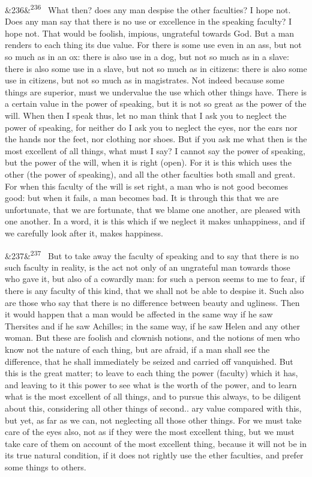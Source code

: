 \documentclass[12pt]{article}
\newcommand{\para}[1][]{\par\noindent\ifx&#1&\else\textsuperscript{\footnotesize #1}~\fi}
\begin{document}
\para[236] What then? does any man despise the other faculties? I hope not. Does any man say that there is no use or excellence in the speaking faculty? I hope not. That would be foolish, impious, ungrateful towards God. But a man renders to each thing its due value. For there is some use even in an ass, but not so much as in an ox: there is also use in a dog, but not so much as in a slave: there is also some use in a slave, but not so much as in citizens: there is also some use in citizens, but not so much as in magistrates. Not indeed because some things are superior, must we undervalue the use which other things have. There is a certain value in the power of speaking, but it is not so great as the power of the will. When then I speak thus, let no man think that I ask you to neglect the power of speaking, for neither do I ask you to neglect the eyes, nor the ears nor the hands nor the feet, nor clothing nor shoes. But if you ask me what then is the most excellent of all things, what must I say? I cannot say the power of speaking, but the power of the will, when it is right (open). For it is this which uses the other (the power of speaking), and all the other faculties both small and great. For when this faculty of the will is set right, a man who is not good becomes good: but when it fails, a man becomes bad. It is through this that we are unfortunate, that we are fortunate, that we blame one another, are pleased with one another. In a word, it is this which if we neglect it makes unhappiness, and if we carefully look after it, makes happiness.

\para[237] But to take away the faculty of speaking and to say that there is no such faculty in reality, is the act not only of an ungrateful man towards those who gave it, but also of a cowardly man: for such a person seems to me to fear, if there is any faculty of this kind, that we shall not be able to despise it. Such also are those who say that there is no difference between beauty and ugliness. Then it would happen that a man would be affected in the same way if he saw Thersites and if he saw Achilles; in the same way, if he saw Helen and any other woman. But these are foolish and clownish notions, and the notions of men who know not the nature of each thing, but are afraid, if a man shall see the difference, that he shall immediately be seized and carried off vanquished. But this is the great matter; to leave to each thing the power (faculty) which it has, and leaving to it this power to see what is the worth of the power, and to learn what is the most excellent of all things, and to pursue this always, to be diligent about this, considering all other things of second.. ary value compared with this, but yet, as far as we can, not neglecting all those other things. For we must take care of the eyes also, not as if they were the most excellent thing, but we must take care of them on account of the most excellent thing, because it will not be in its true natural condition, if it does not rightly use the ether faculties, and prefer some things to others.
\end{document}

